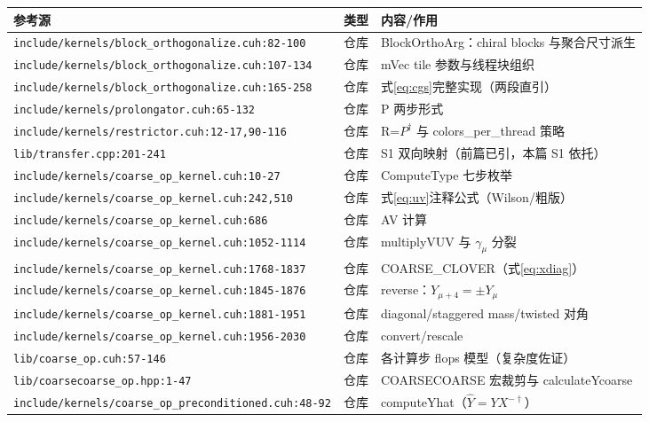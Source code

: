 \documentclass[UTF8]{ctexart}
\begin{document}
\begin{xltabular}{\textwidth}{llX}
\toprule
\textcolor{evidence}{参考源} & 类型 & 内容/作用 \\
\midrule
\endhead
\texttt{\nolinkurl{include/kernels/block_orthogonalize.cuh:82-100}} & 仓库 & BlockOrthoArg：chiral blocks 与聚合尺寸派生 \\
\texttt{\nolinkurl{include/kernels/block_orthogonalize.cuh:107-134}} & 仓库 & mVec tile 参数与线程块组织 \\
\texttt{\nolinkurl{include/kernels/block_orthogonalize.cuh:165-258}} & 仓库 & 式\eqref{eq:cgs}完整实现（两段直引） \\
\texttt{\nolinkurl{include/kernels/prolongator.cuh:65-132}} & 仓库 & P 两步形式 \\
\texttt{\nolinkurl{include/kernels/restrictor.cuh:12-17,90-116}} & 仓库 & R=$P^\dagger$ 与 colors\_per\_thread 策略 \\
\texttt{\nolinkurl{lib/transfer.cpp:201-241}} & 仓库 & S1 双向映射（前篇已引，本篇 S1 依托） \\
\texttt{\nolinkurl{include/kernels/coarse_op_kernel.cuh:10-27}} & 仓库 & ComputeType 七步枚举 \\
\texttt{\nolinkurl{include/kernels/coarse_op_kernel.cuh:242,510}} & 仓库 & 式\eqref{eq:uv}注释公式（Wilson/粗版） \\
\texttt{\nolinkurl{include/kernels/coarse_op_kernel.cuh:686}} & 仓库 & AV 计算 \\
\texttt{\nolinkurl{include/kernels/coarse_op_kernel.cuh:1052-1114}} & 仓库 & multiplyVUV 与 $\gamma_\mu$ 分裂 \\
\texttt{\nolinkurl{include/kernels/coarse_op_kernel.cuh:1768-1837}} & 仓库 & COARSE\_CLOVER（式\eqref{eq:xdiag}） \\
\texttt{\nolinkurl{include/kernels/coarse_op_kernel.cuh:1845-1876}} & 仓库 & reverse：$Y_{\mu+4}=\pm Y_\mu$ \\
\texttt{\nolinkurl{include/kernels/coarse_op_kernel.cuh:1881-1951}} & 仓库 & diagonal/staggered mass/twisted 对角 \\
\texttt{\nolinkurl{include/kernels/coarse_op_kernel.cuh:1956-2030}} & 仓库 & convert/rescale \\
\texttt{\nolinkurl{lib/coarse_op.cuh:57-146}} & 仓库 & 各计算步 flops 模型（复杂度佐证） \\
\texttt{\nolinkurl{lib/coarsecoarse_op.hpp:1-47}} & 仓库 & COARSECOARSE 宏裁剪与 calculateYcoarse \\
\texttt{\nolinkurl{include/kernels/coarse_op_preconditioned.cuh:48-92}} & 仓库 & computeYhat（$\hat Y=Y X^{-\dagger}$） \\

\end{xltabular}
\end{document}
